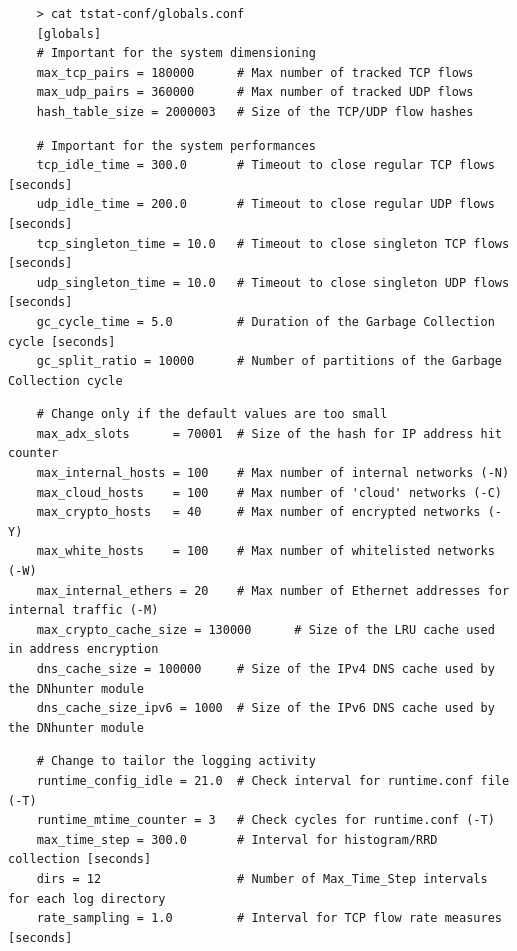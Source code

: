 \documentclass[11pt]{article}
\begin{document}
\begin{small}\begin{verbatim}
    > cat tstat-conf/globals.conf
    [globals]
    # Important for the system dimensioning
    max_tcp_pairs = 180000      # Max number of tracked TCP flows
    max_udp_pairs = 360000      # Max number of tracked UDP flows
    hash_table_size = 2000003   # Size of the TCP/UDP flow hashes
\end{verbatim}\end{small} \noindent
\begin{small}\begin{verbatim}
    # Important for the system performances
    tcp_idle_time = 300.0       # Timeout to close regular TCP flows [seconds]
    udp_idle_time = 200.0       # Timeout to close regular UDP flows [seconds]
    tcp_singleton_time = 10.0   # Timeout to close singleton TCP flows [seconds] 
    udp_singleton_time = 10.0   # Timeout to close singleton UDP flows [seconds]
    gc_cycle_time = 5.0         # Duration of the Garbage Collection cycle [seconds]
    gc_split_ratio = 10000      # Number of partitions of the Garbage Collection cycle
\end{verbatim}\end{small} \noindent
\begin{small}\begin{verbatim}
    # Change only if the default values are too small
    max_adx_slots      = 70001  # Size of the hash for IP address hit counter
    max_internal_hosts = 100    # Max number of internal networks (-N)
    max_cloud_hosts    = 100    # Max number of 'cloud' networks (-C)
    max_crypto_hosts   = 40     # Max number of encrypted networks (-Y)
    max_white_hosts    = 100    # Max number of whitelisted networks (-W)
    max_internal_ethers = 20    # Max number of Ethernet addresses for internal traffic (-M)
    max_crypto_cache_size = 130000      # Size of the LRU cache used in address encryption
    dns_cache_size = 100000     # Size of the IPv4 DNS cache used by the DNhunter module 
    dns_cache_size_ipv6 = 1000  # Size of the IPv6 DNS cache used by the DNhunter module
\end{verbatim}\end{small} \noindent
\begin{small}\begin{verbatim}
    # Change to tailor the logging activity
    runtime_config_idle = 21.0  # Check interval for runtime.conf file (-T) 
    runtime_mtime_counter = 3   # Check cycles for runtime.conf (-T)
    max_time_step = 300.0       # Interval for histogram/RRD collection [seconds]
    dirs = 12                   # Number of Max_Time_Step intervals for each log directory
    rate_sampling = 1.0         # Interval for TCP flow rate measures [seconds]
\end{verbatim}\end{small} \noindent
\end{document}
